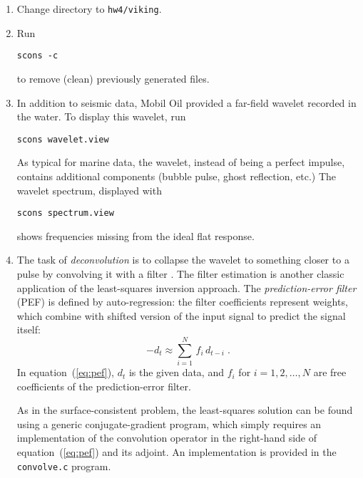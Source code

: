 \begin{enumerate}

\item Change directory to \texttt{hw4/viking}.
\item Run
\begin{verbatim}
scons -c
\end{verbatim}
to remove (clean) previously generated files.
\item In addition to seismic data, Mobil Oil provided a far-field wavelet recorded in the water. To display this wavelet, run
\begin{verbatim}
scons wavelet.view
\end{verbatim}
As typical for marine data, the wavelet, instead of being a perfect
impulse, contains additional components (bubble pulse, ghost
reflection, etc.) The wavelet spectrum, displayed with
\begin{verbatim}
scons spectrum.view
\end{verbatim}
shows frequencies missing from the ideal flat response.


\item The task of \emph{deconvolution} is to collapse the wavelet to
something closer to a pulse by convolving it with a
filter \cite[]{DEC00-00-04820482,DED00-00-07260726}. The filter
estimation is another classic application of the least-squares
inversion approach. The \emph{prediction-error filter} (PEF) is
defined by auto-regression: the filter coefficients represent weights,
which combine with shifted version of the input signal to predict the
signal itself:
\begin{equation}
\label{eq:pef}
-d_t \approx \sum_{i=1}^{N}\,f_i\,d_{t-i}\;.        
\end{equation}
In equation~(\ref{eq:pef}), $d_t$ is the given data, and $f_i$ for
$i=1,2,\ldots,N$ are free coefficients of the prediction-error filter. 

As in the surface-consistent problem, the least-squares solution can
be found using a generic conjugate-gradient program, which simply
requires an implementation of the convolution operator in the
right-hand side of equation~(\ref{eq:pef}) and its adjoint. An
implementation is provided in the \texttt{convolve.c} program.

\lstset{language=c,numbers=left,numberstyle=\tiny,showstringspaces=false}



\end{enumerate}
